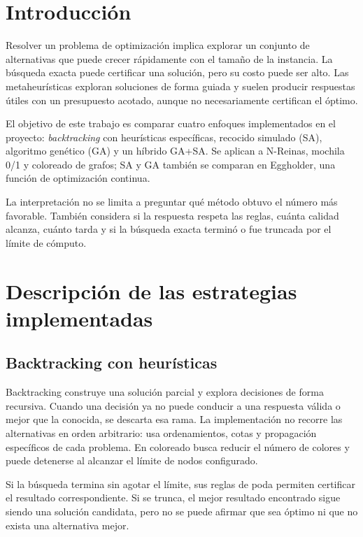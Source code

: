 \documentclass[12pt,letterpaper]{article}
\begin{document}
\tableofcontents
\newpage

\section{Introducción}

Resolver un problema de optimización implica explorar un conjunto de
alternativas que puede crecer rápidamente con el tamaño de la instancia. La
búsqueda exacta puede certificar una solución, pero su costo puede ser alto.
Las metaheurísticas exploran soluciones de forma guiada y suelen producir
respuestas útiles con un presupuesto acotado, aunque no necesariamente
certifican el óptimo.

El objetivo de este trabajo es comparar cuatro enfoques implementados en el
proyecto: \emph{backtracking} con heurísticas específicas, recocido simulado
(SA), algoritmo genético (GA) y un híbrido GA+SA. Se aplican a N-Reinas,
mochila 0/1 y coloreado de grafos; SA y GA también se comparan en Eggholder,
una función de optimización continua.

La interpretación no se limita a preguntar qué método obtuvo el número más
favorable. También considera si la respuesta respeta las reglas, cuánta calidad
alcanza, cuánto tarda y si la búsqueda exacta terminó o fue truncada por el
límite de cómputo.

\section{Descripción de las estrategias implementadas}

\subsection{Backtracking con heurísticas}

Backtracking construye una solución parcial y explora decisiones de forma
recursiva. Cuando una decisión ya no puede conducir a una respuesta válida o
mejor que la conocida, se descarta esa rama. La implementación no recorre las
alternativas en orden arbitrario: usa ordenamientos, cotas y propagación
específicos de cada problema. En coloreado busca reducir el número de colores y
puede detenerse al alcanzar el límite de nodos configurado.

Si la búsqueda termina sin agotar el límite, sus reglas de poda permiten
certificar el resultado correspondiente. Si se trunca, el mejor resultado
encontrado sigue siendo una solución candidata, pero no se puede afirmar que
sea óptimo ni que no exista una alternativa mejor.
\end{document}
